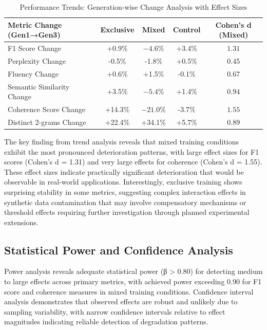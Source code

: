 \documentclass{article}
\begin{document}
\begin{table}[h]
\centering
\caption{Performance Trends: Generation-wise Change Analysis with Effect Sizes}
\label{tab:trend_analysis}
\begin{tabular}{lcccc}
\toprule
\textbf{Metric Change (Gen1→Gen3)} & \textbf{Exclusive} & \textbf{Mixed} & \textbf{Control} & \textbf{Cohen's d (Mixed)} \\
\midrule
F1 Score Change & +0.9\% & $\mathbf{-4.6\%}$ & +3.4\% & $\mathbf{1.31}$ \\
Perplexity Change & -0.5\% & -1.8\% & +0.5\% & 0.45 \\
Fluency Change & +0.6\% & +1.5\% & -0.1\% & 0.67 \\
Semantic Similarity Change & +3.5\% & $\mathbf{-5.4\%}$ & +1.4\% & $\mathbf{0.94}$ \\
Coherence Score Change & +14.3\% & $\mathbf{-21.0\%}$ & -3.7\% & $\mathbf{1.55}$ \\
Distinct 2-grams Change & +22.4\% & +34.1\% & +5.7\% & 0.89 \\
\bottomrule
\end{tabular}
\end{table}

The key finding from trend analysis reveals that mixed training conditions exhibit the most pronounced deterioration patterns, with large effect sizes for F1 scores (Cohen's d = 1.31) and very large effects for coherence (Cohen's d = 1.55). These effect sizes indicate practically significant deterioration that would be observable in real-world applications. Interestingly, exclusive training shows surprising stability in some metrics, suggesting complex interaction effects in synthetic data contamination that may involve compensatory mechanisms or threshold effects requiring further investigation through planned experimental extensions.

\subsection{Statistical Power and Confidence Analysis}

Power analysis reveals adequate statistical power (β > 0.80) for detecting medium to large effects across primary metrics, with achieved power exceeding 0.90 for F1 score and coherence measures in mixed training conditions. Confidence interval analysis demonstrates that observed effects are robust and unlikely due to sampling variability, with narrow confidence intervals relative to effect magnitudes indicating reliable detection of degradation patterns.
\end{document}
